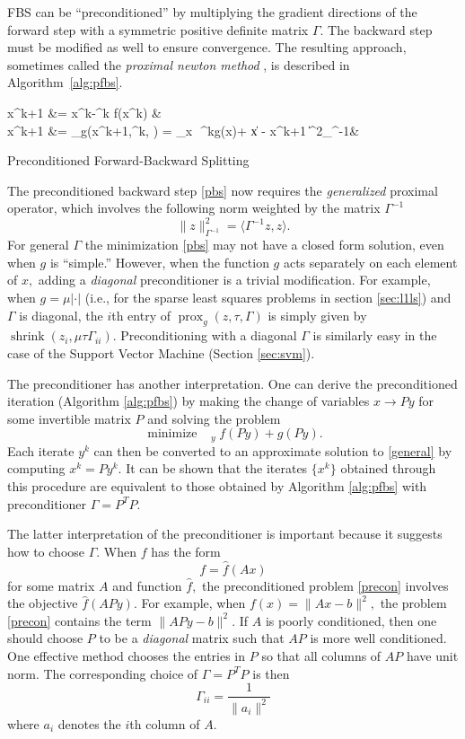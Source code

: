 \documentclass{amsart}
\newcommand{\eqn}[2]{\begin{equation}\label{#1}#2\end{equation}}
\newcommand{\ra}{\rangle}
\newcommand{\la}{\langle}
\DeclareMathOperator*{\minimize}{minimize\quad}
\DeclareMathOperator*{\argmin}{arg\,min}
\DeclareMathOperator*{\shrink}{shrink}
\DeclareMathOperator{\prox}{prox}
\theoremstyle{definition}
\begin{document}
FBS can be ``preconditioned'' by multiplying the gradient directions of the forward step with a symmetric positive definite matrix $\Gamma.$  The backward step must be modified as well to ensure convergence.  The resulting approach, sometimes called the {\em proximal newton method} \cite{Bertsekas82, LSS12}, is described in Algorithm~\ref{alg:pfbs}.  
\begin{algorithm}[H]
\begin{algorithmic}
 \begin{flalign}
    \qquad \hat x^{k+1} &= x^k-\tau^k \Gamma \nabla f(x^k) \label{pfs}&\\
  \label{pbs}   x^{k+1} &= \prox_g(\hat x^{k+1},\tau^k, \Gamma) = \argmin_x\,\, \tau^kg(x)+ \| x - \hat x^{k+1} \|^2_{\Gamma^{-1}}&
  \end{flalign}
\EndWhile
\end{algorithmic}
\caption{Preconditioned Forward-Backward Splitting}
\label{alg:pfbs}
\end{algorithm} 
The preconditioned backward step \eqref{pbs} now requires the {\em generalized} proximal operator, which involves the following norm weighted by the matrix $\Gamma^{-1}$
  $$\|z\|^2_{\Gamma^{-1}} = \la \Gamma^{-1} z,z \ra.$$
For general $\Gamma$ the minimization \eqref{pbs} may not have a closed form solution, even when $g$ is ``simple.''  However, when the function $g$ acts separately on each element of $x,$ adding a {\em diagonal} preconditioner is a trivial modification.   For example, when $g=\mu |\cdot|$  (i.e., for the sparse least squares problems in section \ref{sec:l1ls}) and $\Gamma$ is diagonal, the $i$th entry of $ \prox_g(z ,\tau, \Gamma)$ is simply given by $\shrink(z_i,\mu\tau\Gamma_{ii}).$  Preconditioning with a diagonal $\Gamma$ is similarly easy in the case of the Support Vector Machine (Section \ref{sec:svm}).

   The preconditioner has another interpretation.  One can derive the preconditioned iteration (Algorithm \ref{alg:pfbs}) by making the change of variables $x\to Py$ for some invertible matrix $P$ and solving the problem 
     \eqn{precon}{\minimize_y f(Py)+g(Py).}
Each iterate $y^k$ can then be converted to an approximate solution to \eqref{general} by computing $x^k = Py^k.$ It can be shown that the iterates $\{x^k\}$ obtained through this procedure are equivalent to those obtained by Algorithm \ref{alg:pfbs} with preconditioner $\Gamma = P^TP.$ 

   The latter interpretation of the preconditioner is important because it suggests how to choose $\Gamma.$  When $f$ has the form $$f = \hat f (Ax)$$
for some matrix $A$ and function $\hat f,$  the preconditioned problem \eqref{precon} involves the objective $\hat f(APy).$  For example, when $f(x) = \|Ax-b\|^2,$ the problem \eqref{precon} contains the term $\|APy-b\|^2.$  If $A$ is poorly conditioned, then one should choose $P$ to be a {\em diagonal} matrix such that $AP$ is more well conditioned.  One effective method chooses the entries in $P$ so that all columns of $AP$ have unit norm.  The corresponding choice of $\Gamma = P^TP$ is then
  $$\Gamma_{ii} = \frac{1}{\|a_i\|^2}$$ 
  where $a_i$ denotes the $i$th column of $A.$
  
\end{document}

